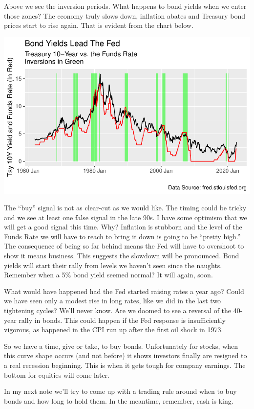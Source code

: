 \documentclass[
  letterpaper,
  DIV=11,
  numbers=noendperiod]{scrartcl}
\begin{document}
Above we see the inversion periods. What happens to bond yields when we
enter those zones? The economy truly slows down, inflation abates and
Treasury bond prices start to rise again. That is evident from the chart
below.

\includegraphics{thoughts_on_rates_pt2_files/figure-pdf/yeilds_lead_fed-1.pdf}

The ``buy'' signal is not as clear-cut as we would like. The timing
could be tricky and we see at least one false signal in the late 90s. I
have some optimism that we will get a good signal this time. Why?
Inflation is stubborn and the level of the Funds Rate we will have to
reach to bring it down is going to be ``pretty high.'' The consequence
of being so far behind means the Fed will have to overshoot to show it
means business. This suggests the slowdown will be pronounced. Bond
yields will start their rally from levels we haven't seen since the
naughts. Remember when a 5\% bond yield seemed normal? It will again,
soon.

What would have happened had the Fed started raising rates a year ago?
Could we have seen only a modest rise in long rates, like we did in the
last two tightening cycles? We'll never know. Are we doomed to see a
reversal of the 40-year rally in bonds. This could happen if the Fed
response is insufficiently vigorous, as happened in the CPI run up after
the first oil shock in 1973.

So we have a time, give or take, to buy bonds. Unfortunately for stocks,
when this curve shape occurs (and not before) it shows investors finally
are resigned to a real recession beginning. This is when it gets tough
for company earnings. The bottom for equities will come later.

In my next note we'll try to come up with a trading rule around when to
buy bonds and how long to hold them. In the meantime, remember, cash is
king.
\end{document}
